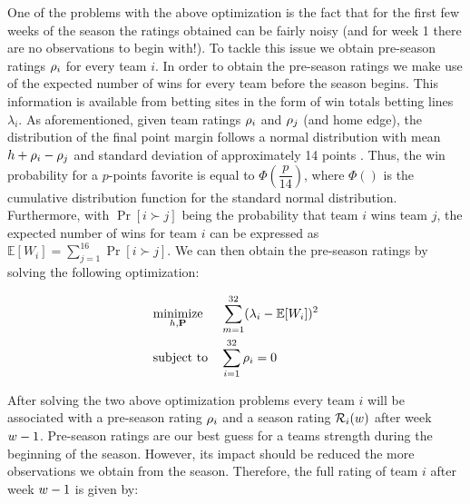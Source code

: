 \documentclass{sig-alternate}
\begin{document}
One of the problems with the above optimization is the fact that for the first few weeks of the season the ratings obtained can be fairly noisy (and for week 1 there are no observations to begin with!). 
To tackle this issue we obtain pre-season ratings $\rho_i$ for every team $i$. 
In order to obtain the pre-season ratings we make use of the expected number of wins for every team before the season begins. 
This information is available from betting sites in the form of win totals betting lines $\lambda_i$. 
As aforementioned, given team ratings $\rho_i$ and $\rho_j$ (and home edge), the distribution of the final point margin follows a normal distribution with mean $h + \rho_i - \rho_j$ and standard deviation of approximately 14 points \cite{stern91}. 
Thus, the win probability for a $p$-points favorite is equal to $\Phi(\dfrac{p}{14})$, where $\Phi()$ is the cumulative distribution function for the standard normal distribution. 
Furthermore, with $\Pr[i \succ j]$ being the probability that team $i$ wins team $j$, the expected number of wins for team $i$ can be expressed as $\mathbb{E}[W_i] = \sum_{j=1}^{16} \Pr[i \succ j]$.  
We can then obtain the pre-season ratings by solving the following optimization: 

\begin{equation*}
\begin{aligned}
& \underset{h,\mathbf{P}}{\text{minimize}}
& & \sum_{m=1}^{32} (\lambda_i- \mathbb{E}[W_i])^2 \\
& \text{subject to}
& & \sum_{i=1}^{32} \rho_i = 0
\end{aligned}
\end{equation*}

After solving the two above optimization problems every team $i$ will be associated with a pre-season rating $\rho_i$ and a season rating $\mathcal{R}_i(w)$ after week $w - 1$.  
Pre-season ratings are our best guess for a teams strength during the beginning of the season. 
However, its impact should be reduced the more observations we obtain from the season.  
Therefore, the full rating of team $i$ after week $w - 1$ is given by:
\end{document}
